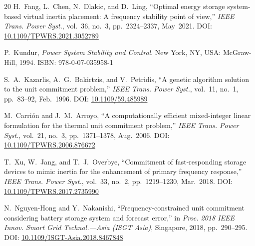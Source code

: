 \documentclass[journal]{IEEEtran}
\begin{document}
\begin{thebibliography}{20}
H.~Fang, L.~Chen, N.~Dlakic, and D.~Ling,
``Optimal energy storage system-based virtual inertia placement:
A frequency stability point of view,''
\textit{IEEE Trans. Power Syst.}, vol.~36, no.~3,
pp.~2324--2337, May~2021.
DOI: \href{https://doi.org/10.1109/TPWRS.2021.3052789}
{10.1109/TPWRS.2021.3052789}

P.~Kundur,
\textit{Power System Stability and Control}.
New York, NY, USA: McGraw-Hill, 1994.
ISBN: 978-0-07-035958-1

S.~A.~Kazarlis, A.~G.~Bakirtzis, and V.~Petridis,
``A genetic algorithm solution to the unit commitment problem,''
\textit{IEEE Trans. Power Syst.},
vol.~11, no.~1, pp.~83--92, Feb.~1996.
DOI: \href{https://doi.org/10.1109/59.485989}
{10.1109/59.485989}

M.~Carri\'on and J.~M.~Arroyo,
``A computationally efficient mixed-integer linear formulation
for the thermal unit commitment problem,''
\textit{IEEE Trans. Power Syst.},
vol.~21, no.~3, pp.~1371--1378, Aug.~2006.
DOI: \href{https://doi.org/10.1109/TPWRS.2006.876672}
{10.1109/TPWRS.2006.876672}

T.~Xu, W.~Jang, and T.~J.~Overbye,
``Commitment of fast-responding storage devices to mimic inertia
for the enhancement of primary frequency response,''
\textit{IEEE Trans. Power Syst.},
vol.~33, no.~2, pp.~1219--1230, Mar.~2018.
DOI: \href{https://doi.org/10.1109/TPWRS.2017.2735990}
{10.1109/TPWRS.2017.2735990}

N.~Nguyen-Hong and Y.~Nakanishi,
``Frequency-constrained unit commitment considering battery
storage system and forecast error,''
in \textit{Proc. 2018 IEEE Innov. Smart Grid Technol.---Asia
(ISGT Asia)}, Singapore, 2018, pp.~290--295.
DOI: \href{https://doi.org/10.1109/ISGT-Asia.2018.8467848}
{10.1109/ISGT-Asia.2018.8467848}

\end{thebibliography}
\end{document}
